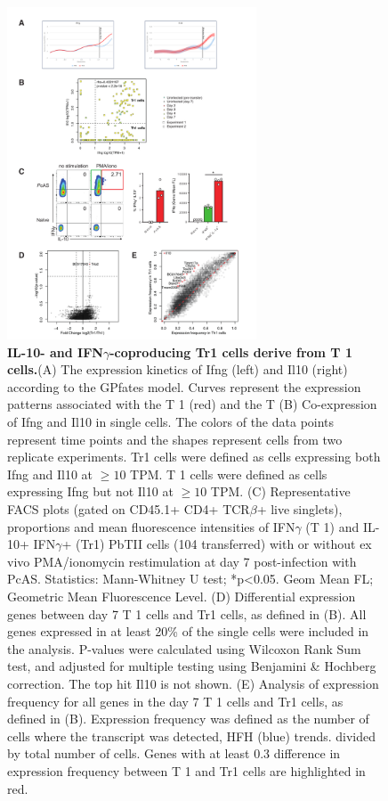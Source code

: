 \begin{figure}
    \centering
    \includegraphics[width=0.66\textwidth]{"Fig S15 rev3"}
    \caption[IL-10- and IFN\( \gamma \)-coproducing Tr1 cells derive from T 1 cells]{\textbf{IL-10- and IFN\( \gamma \)-coproducing Tr1 cells derive from T 1 cells.}(A) The expression kinetics of Ifng (left) and Il10 (right) according to the GPfates model. Curves represent the expression patterns associated with the T 1 (red) and the T (B) Co-expression of Ifng and Il10 in single cells. The colors of the data points represent time points and the shapes represent cells from two replicate experiments. Tr1 cells were defined as cells expressing both Ifng and Il10 at \( \geq 10 \) TPM. T 1 cells were defined as cells expressing Ifng but not Il10 at \( \geq 10 \) TPM. (C) Representative FACS plots (gated on CD45.1+ CD4+ TCR\( \beta \)+ live singlets), proportions and mean fluorescence intensities of IFN\( \gamma \) (T 1) and IL-10+ IFN\( \gamma \)+ (Tr1) PbTII cells (104 transferred) with or without ex vivo PMA/ionomycin restimulation at day 7 post-infection with PcAS. Statistics: Mann-Whitney U test; *p<0.05. Geom Mean FL; Geometric Mean Fluorescence Level. (D) Differential expression genes between day 7 T 1 cells and Tr1 cells, as defined in (B). All genes expressed in at least 20\% of the single cells were included in the analysis. P-values were calculated using Wilcoxon Rank Sum test, and adjusted for multiple testing using Benjamini \& Hochberg correction. The top hit Il10 is not shown. (E) Analysis of expression frequency for all genes in the day 7 T 1 cells and Tr1 cells, as defined in (B). Expression frequency was defined as the number of cells where the transcript was detected, HFH (blue) trends. divided by total number of cells. Genes with at least 0.3 difference in expression frequency between T 1 and Tr1 cells are highlighted in red.}
    \label{fig:ms15}
\end{figure}

